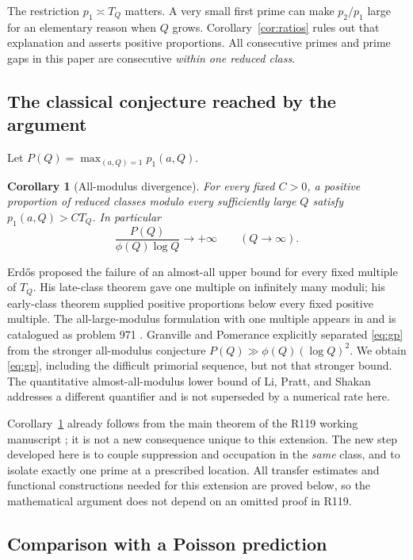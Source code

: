 \documentclass[11pt]{article}
\newtheorem{corollary}[theorem]{Corollary}
\theoremstyle{remark}
\numberwithin{equation}{section}
\begin{document}
The restriction $p_1\asymp T_Q$ matters. A very small first prime
can make $p_2/p_1$ large for an elementary reason when $Q$ grows.
Corollary~\ref{cor:ratios} rules out that explanation and asserts
positive proportions. All consecutive primes and prime gaps in
this paper are consecutive \emph{within one reduced class}.

\subsection{The classical conjecture reached by the argument}

Let $P(Q)=\max_{(a,Q)=1}p_1(a,Q)$.
\begin{corollary}[All-modulus divergence]\label{cor:gp}
For every fixed $C>0$, a positive proportion of reduced classes
modulo every sufficiently large $Q$ satisfy $p_1(a,Q)>CT_Q$.
In particular
\begin{equation}\label{eq:gp}
 \frac{P(Q)}{\phi(Q)\log Q}\longrightarrow+\infty
 \qquad(Q\to\infty).
\end{equation}
\end{corollary}

Erd\H os \cite[p.~57]{E49} proposed the failure of an almost-all
upper bound for every fixed multiple of $T_Q$. His late-class
theorem gave one multiple on infinitely many moduli; his early-class
theorem supplied positive proportions below every fixed positive
multiple. The all-large-modulus formulation with one multiple
appears in \cite[p.~209]{E65} and is catalogued as problem 971
\cite{Bloom}.
Granville and Pomerance \cite[p.~194]{GP} explicitly separated
\eqref{eq:gp} from the stronger all-modulus conjecture
$P(Q)\gg\phi(Q)(\log Q)^2$. We obtain \eqref{eq:gp}, including
the difficult primorial sequence, but not that stronger bound.
The quantitative almost-all-modulus lower bound of Li, Pratt, and
Shakan \cite{LPS} addresses a different quantifier and is not
superseded by a numerical rate here.

Corollary~\ref{cor:gp} already follows from the main theorem of the
R119 working manuscript \cite{Meiji119}; it is not a new consequence
unique to this extension. The new step developed here is to couple
suppression and occupation in the \emph{same} class, and to isolate
exactly one prime at a prescribed location. All transfer estimates
and functional constructions needed for this extension are proved
below, so the mathematical argument does not depend on an omitted
proof in R119.

\subsection{Comparison with a Poisson prediction}
\end{document}
